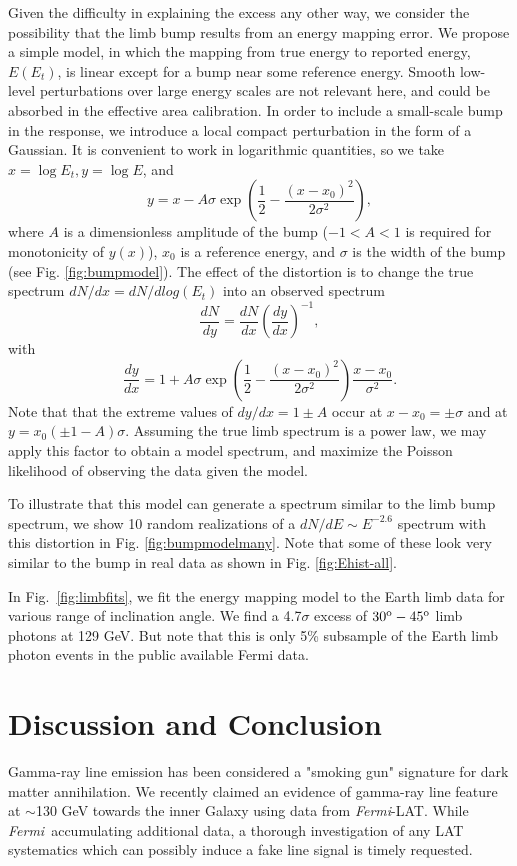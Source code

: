 \documentclass[aps,twocolumn,prd,superscriptaddress,showpacs,nofootinbib,fixfloat]{revtex4}
\newcommand{\be}{\begin{equation}}
\newcommand{\ee}{\end{equation}}
\newcommand{\Fermi}{{\slshape Fermi}}
\newcommand{\degree}{^{\rm o}}
\begin{document}
Given the difficulty in explaining the excess any other way,
we consider the possibility that the limb bump results from
an energy mapping error.  We propose a simple model, in
which the mapping from true energy to reported energy,
$E(E_t)$, is linear except for a bump near some reference
energy.  Smooth low-level perturbations over large energy
scales are not relevant here, and could be absorbed in the
effective area calibration.  In order to include a
small-scale bump in the response, we introduce a local
compact perturbation in the form of a Gaussian.  It is
convenient to work in logarithmic quantities, so we take
$x=\log E_t, y=\log E$, and \be
\label{eq:yofx}
y=x - A\sigma \exp\left(\frac{1}{2}-\frac{(x-x_0)^2}{2\sigma^2}\right),
\ee
where $A$ is a dimensionless amplitude of the bump ($-1<A<1$
is required for monotonicity of $y(x)$), $x_0$ is a
reference energy, and $\sigma$ is the width of the bump (see
Fig. \ref{fig:bumpmodel}).  The effect of the distortion is
to change the true spectrum $dN/dx = dN/dlog(E_t)$ into an
observed spectrum
\be
\label{eq:dndy}
\frac{dN}{dy} = \frac{dN}{dx} \left(\frac{dy}{dx}\right)^{-1} ,
\ee
with
\be
\label{eq:dydx}
\frac{dy}{dx} = 1 + A\sigma \exp\left(\frac{1}{2}-\frac{(x-x_0)^2}{2\sigma^2}\right)
\frac{x-x_0}{\sigma^2}.
\ee
Note that that the extreme values of $dy/dx = 1 \pm A$ occur
at $x-x_0 = \pm \sigma$ and at $y=x_0(\pm1-A)\sigma$.
Assuming the true limb spectrum is a power law, we may apply
this factor to obtain a model spectrum, and maximize the
Poisson likelihood of observing the data given the model.

To illustrate that this model can generate a spectrum
similar to the limb bump spectrum, we show 10 random
realizations of a $dN/dE \sim E^{-2.6}$ spectrum with this
distortion in Fig. \ref{fig:bumpmodelmany}.  Note that some of these
look very similar to the bump in real data as shown in Fig. \ref{fig:Ehist-all}. 

In Fig.~\ref{fig:limbfits}, we fit the energy mapping model
to the Earth limb data for various range of inclination
angle. We find a 4.7$\sigma$ excess of $30\degree-45\degree$
limb photons at 129 GeV. But note that this is only 5\% subsample of the Earth limb photon events in the public available Fermi data.


\section{Discussion and Conclusion}

Gamma-ray line emission has been considered a "smoking gun" signature for dark matter annihilation. 
We recently claimed an evidence of gamma-ray line feature at
$\sim$130 GeV towards the inner Galaxy using data from
\Fermi-LAT. While \Fermi\ accumulating additional
data, a thorough investigation of any LAT systematics
which can possibly induce a fake line signal is timely requested.
\end{document}
